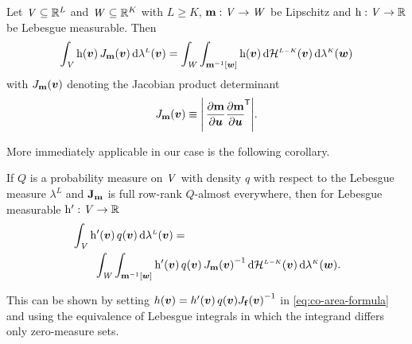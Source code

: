 \begin{theorem}\label{thm:co-area-formula}
Let $\mathit{V} \subseteq \mathbb{R}^L$ and $\mathit{W} \subseteq \mathbb{R}^K$ with $L \geq K$, ${\mathbf{m}}:\mathit{V}\to\mathit{W}$ be Lipschitz and $\mathrm{h} : \mathit{V} \to \mathbb{R}$ be Lebesgue measurable. Then
\begin{equation}\label{eq:co-area-formula}
    \int_{\set{V}} 
      \func{h}(\vct{v}) \, \jacobproddet{\vctfunc{m}}{\vct{v}}
    \,\dr\lebm{L}(\vct{v})
    = 
    \int_{\set{W}}
      \int_{\preimage{\vctfunc{m}}{\vct{w}}} \func{h}(\vct{v}) \,\dr\haum{L-K}(\vct{v})
    \,\dr\lebm{K}(\vct{w})
\end{equation}
with $\jacobproddet{\vctfunc{m}}{\vct{v}}$ denoting the Jacobian product determinant
\begin{equation}\label{eq:jacobian-product-det}
  \jacobproddet{\vctfunc{m}}{\vct{v}} \equiv 
  \left|\,\pd{\vctfunc{m}}{\vct{u}}\pd{\vctfunc{m}}{\vct{u}}\tr\right|.
\end{equation}
\end{theorem}
More immediately applicable in our case is the following corollary.
\begin{corollary}\label{col:co-area-formula}
If $Q$ is a probability measure on $\mathit{V}$ with density $q$ with respect to the Lebesgue measure $\lambda^L$ and $\mathbf{J}_{{\mathbf{m}}}$ is full row-rank $Q$-almost everywhere, then for Lebesgue measurable $\mathrm{h}' : \mathit{V} \to \mathbb{R}$
\begin{equation}\label{eq:co-area-formula-corollary}
\begin{split}
    &\int_{\set{V}} 
      \func{h}'(\vct{v})\,q(\vct{v})
    \,\dr\lebm{L}(\vct{v})
    =\,\\
    &\qquad
    \int_{\set{W}}
      \int_{\preimage{\vctfunc{m}}{\vct{w}}}
        \func{h}'(\vct{v}) \,
        q(\vct{v})\,
        \jacobproddet{\vctfunc{m}}{\vct{v}}^{-1}
      \,\dr\haum{L-K}(\vct{v})
    \,\dr\lebm{K}(\vct{w}).
\end{split}
\end{equation}
\end{corollary}
This can be shown by setting $h(\vct{v}) = h'(\vct{v})\,q(\vct{v})\jacobproddet{\vctfunc{f}}{\vct{v}}^{-1}$ in \eqref{eq:co-area-formula} and using the equivalence of Lebesgue integrals in which the integrand differs only zero-measure sets. 

